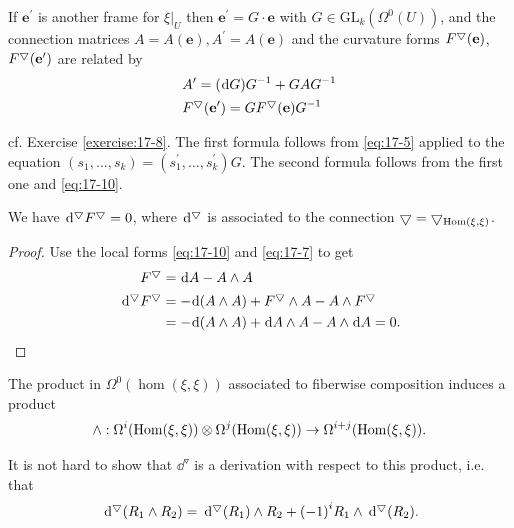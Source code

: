 If ${\mathbf{e}}^{\prime }$ is another frame for ${\left. \xi \right| }_{U}$ then ${\mathbf{e}}^{\prime } = G \cdot  \mathbf{e}$ 
with $G \in  {\mathrm{{GL}}}_{k}( {\Omega^0( U) })$, and the connection matrices $A = A( \mathbf{e}),{A}^{\prime } = A( \mathbf{e})$ 
and the curvature forms ${F}^\bigtriangledown( \mathbf{e})$, $F^\bigtriangledown ({\mathbf{e}}^{\prime })$ are related by
\begin{align}\label{eq:17-18}
  \begin{aligned}
    & {A}^{\prime } = ( {\!\dd G}) {G}^{-1} + {GA}{G}^{-1}\\
    & {F}^\btd( {\mathbf{e}}^{\prime })  = G{F}^\btd( \mathbf{e}) {G}^{-1}
  \end{aligned}
\end{align}

cf. Exercise \ref{exercise:17-8}. The first formula follows from \eqref{eq:17-5} applied to the 
equation $( {{s}_1,\ldots,{s}_{k}})  = ( {{s}_1^{\prime },\ldots,{s}_{k}^{\prime }}) G$. The second formula follows 
from the first one and \eqref{eq:17-10}.

\begin{theorem}\label{theorem:17-13}
  We have $\dd^\btd{F}^\btd = 0$, where $\dd^\btd$ is associated to the connection $\bigtriangledown = \bigtriangledown_{\operatorname{Hom}(\xi, \xi) }$.
\end{theorem}

\begin{proof}
Use the local forms \eqref{eq:17-10} and \eqref{eq:17-7} to get
\begin{align*}
  {F}^\btd & = {\!\dd A}- A \land  A \\
  \dd^\btd{F}^\btd 
    & = - \!\dd ( {A \land  A})  + {F}^\btd \land  A- A \land  {F}^\btd\\
    & = - \!\dd ( {A \land  A})  + {\!\dd A} \land  A- A \land  {\!\dd A} = 0.
\end{align*}
\end{proof}

The product in $\Omega^0( \hom(\xi, \xi))$ associated to fiberwise composition induces a product
\[
  \land:\Omega^{i}( \operatorname{Hom}(\xi, \xi))  \otimes  \Omega^{j}( \operatorname{Hom}(\xi, \xi)) 
  \rightarrow \Omega^{i + j}( \operatorname{Hom}(\xi, \xi)).
\]

It is not hard to show that $\dd^{ \triangledown  }$ is a derivation with respect to this product, i.e. that
\begin{align}\label{eq:17-19}
  \dd^\btd( {{R}_1 \land  {R}_{2}}) 
  = \dd^\btd( {R}_1)  \land  {R}_{2} + {(-1) }^{i}{R}_1 \land  \dd^\btd( {R}_{2}).
\end{align}

